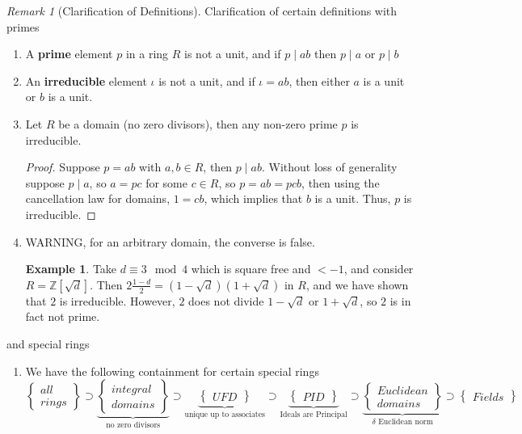 \documentclass[12pt]{article}
\theoremstyle{definition}
\newtheorem{eg}[thm]{Example}
\theoremstyle{remark}
\newtheorem{rmk}[thm]{Remark}
\numberwithin{equation}{section}
\newcommand\Z{\mathbb Z}    %
\newcommand\B[1]{\textbf{ #1}}
\begin{document}
\begin{rmk}[Clarification of Definitions]
        Clarification of certain definitions with primes \begin{enumerate}
                \item A \B{prime} element $p$ in a ring $R$ is not a unit, and if $p\;\vert\;ab$ then $p\;\vert\;a$ or $p\;\vert\;b$
                \item An \B{irreducible} element $\iota$ is not a unit, and if $\iota = ab$, then either $a$ is a unit or $b$ is a unit.
                \item Let $R$ be a domain (no zero divisors), then any non-zero prime $p$ is irreducible. 
                        \begin{proof}
                                Suppose $p = ab$ with $a,b \in R$, then $p\;\vert\;ab$. Without loss of generality suppose $p\;\vert\;a$, so $a = pc$ for some $c \in R$, so $p = ab = pcb$, then using the cancellation law for domains, $1 = cb$, which implies that $b$ is a unit. Thus, $p$ is irreducible.
                        \end{proof}
                \item WARNING, for an arbitrary domain, the converse is false.
                        \begin{eg}
                                Take $d \equiv 3 \mod 4$ which is square free and $< -1$, and consider $R = \Z[\sqrt{d}]$. Then $2\frac{1-d}{2} = (1-\sqrt{d})(1+\sqrt{d})$ in $R$, and we have shown that $2$ is irreducible. However, $2$ does not divide $1-\sqrt{d}$ or $1+\sqrt{d}$, so $2$ is in fact not prime.
                        \end{eg}
        \end{enumerate}
        and special rings \begin{enumerate}
                \item We have the following containment for certain special rings \begin{equation}
                                \left\{\begin{array}{c} all \\ rings \end{array}\right\} \supset \underbrace{\left\{\begin{array}{c} integral \\ domains \end{array}\right\}}_{\text{no zero divisors}} \supset \underbrace{\left\{\begin{array}{c} UFD \end{array}\right\}}_{\text{unique up to associates}} \supset \underbrace{\left\{\begin{array}{c} PID \end{array}\right\}}_{\text{Ideals are Principal}} \supset \underbrace{\left\{\begin{array}{c} Euclidean \\ domains \end{array}\right\}}_{\text{$\delta$ Euclidean norm}} \supset \left\{\begin{array}{c} Fields  \end{array}\right\}

\end{equation}
\end{enumerate}
\end{rmk}
\end{document}
